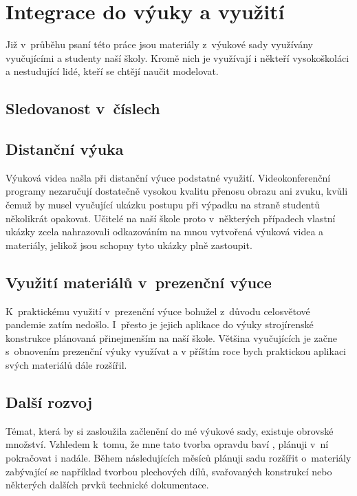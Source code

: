 \chapter{Integrace do výuky a využití}
Již v~průběhu psaní této práce jsou materiály z~výukové sady využívány vyučujícími a studenty naší školy.
Kromě nich je využívají i někteří vysokoškoláci a nestudující lidé, kteří se chtějí naučit modelovat.

\section{Sledovanost v~číslech}
\B{\textcolor{mygreen}{PŠ: Tuto sekci bych rád vztáhnul ke konkrétnímu datu a zmínil konkrétní čísla. Rád bych počkal ještě nějakou chvíli, mezitím by se sledovanost měla přehoupnout přes ty dva tisíce. TZN napíšu nejpozději ve středu večer... }\normalsize}

\section{Distanční výuka}
Výuková videa našla při distanční výuce podstatné využití.
Videokonferenční programy nezaručují dostatečně vysokou kvalitu přenosu obrazu ani zvuku, kvůli čemuž by musel vyučující ukázku postupu při výpadku na straně studentů několikrát opakovat.
Učitelé na naší škole proto v~některých případech vlastní ukázky zcela nahrazovali odkazováním na mnou vytvořená výuková videa a materiály, jelikož jsou schopny tyto ukázky plně zastoupit.
\B{\textcolor{red}{PŠ: DOPSAT PÁR VĚT.}}

\section{Využití materiálů v~prezenční výuce}
K~praktickému využití v~prezenční výuce bohužel z~důvodu celosvětové pandemie zatím nedošlo. 
I~přesto je jejich aplikace do výuky strojírenské konstrukce plánovaná přinejmenším na naší škole.
Většina vyučujících je začne s~obnovením prezenční výuky využívat a v příštím roce bych praktickou aplikaci svých materiálů dále rozšířil.

\B{\textcolor{red}{Je důležité říci, že materiály jsou volně dostupné, a proto je může při výuce již nyní využít mnoho učitelů. Ještě něcoc o tom, jak je to cool a jak snadno je to začlenitelné :-)}} 

\section{Další rozvoj}
\B{\textcolor{red}{PŠ: Odsunout do závěru?}}\newline
Témat, která by si zasloužila začlenění do mé výukové sady, existuje obrovské množství.
Vzhledem k~tomu, že mne tato tvorba opravdu baví \B{\textcolor{yellow}{(napiš tam něco o tom, že tě to nejenom baví, ale že je to i významná pomoc studentům, ale i pedagogům)}} , plánuji v~ní pokračovat i nadále.
Během následujících měsíců plánuji sadu rozšířit o~materiály zabývající se například tvorbou plechových dílů, svařovaných konstrukcí nebo některých dalších prvků technické dokumentace.
